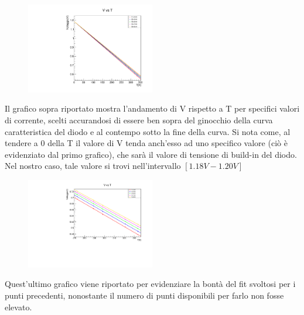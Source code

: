 \documentclass[10pt,twocolumn]{article}
\begin{document}
\begin{figure}[H] %
  \centering
  \includegraphics[width=0.5\textwidth]{V_vs_T.pdf} %
  \label{fig:VI}
\end{figure}
Il grafico sopra riportato mostra l'andamento di V rispetto a T
per specifici valori di corrente, scelti accurandosi di essere ben sopra del ginocchio della curva caratteristica del diodo
e al contempo sotto la fine della curva.
Si nota come, al tendere a 0 della T il valore di V tenda anch'esso ad uno specifico valore (ciò è evidenziato dal primo grafico), che sarà il valore
di tensione di build-in del diodo. Nel nostro caso, tale valore si trovi nell'intervallo $[1.18V-1.20V]$
\begin{figure} [H]%
  \centering
  \includegraphics[width=0.5\textwidth]{V_vs_T_lim.pdf} %
  \label{fig:VII}
\end{figure}

Quest'ultimo grafico viene riportato per evidenziare la bontà del fit svoltosi per i punti precedenti, 
nonostante il numero di punti disponibili per farlo non fosse elevato.
\end{document}
